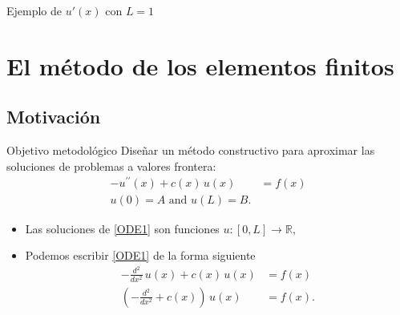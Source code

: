 \documentclass[10pt,handout]{beamer}
\theoremstyle{plain} %
\theoremstyle{plain} %
\theoremstyle{plain} %
\theoremstyle{plain} %
\theoremstyle{definition}
\theoremstyle{example}
\theoremstyle{example}
\theoremstyle{remark}
\theoremstyle{remark}
\begin{document}
\begin{frame}{Ejemplo de $u'(x)$ con $L=1$}
\end{frame}

\section{El método de los elementos finitos}

\subsection{Motivación}

\begin{frame}
\begin{block}{Objetivo metodológico}
Diseñar un método constructivo para aproximar las soluciones de problemas a valores frontera:
\begin{align}
- u^{\prime \prime}(x) + c(x)\,u(x) & = f(x) \label{ODE1} \\ 
 u(0) = A  \text{ and } u(L) = B.  \label{ODE2}
\end{align}
\begin{itemize}
\item Las soluciones de \eqref{ODE1} son funciones $u:[0,L] \longrightarrow \mathbb{R},$
\item Podemos escribir \eqref{ODE1} de la forma siguiente
\begin{align}
-\frac{d^2}{dx^2} \, u(x) + c(x) \, u(x) & =  f(x)  \label{ODE1a} \\
\left(-\frac{d^2}{dx^2} + c(x) \right)\, u(x) & =  f(x).  \label{ODE1b}
\end{align}
\end{itemize}
\end{block}
\end{frame}
\end{document}
